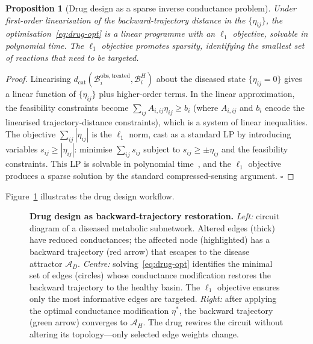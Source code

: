\documentclass[twocolumn,10pt,a4paper]{article}
\newcommand{\dcat}{d_{\mathrm{cat}}}
\newcommand{\Back}{\mathcal{B}}
\newtheorem{proposition}[theorem]{Proposition}
\begin{document}
\begin{proposition}[Drug design as a sparse inverse conductance problem]
\label{prop:drug-inverse}
Under first-order linearisation of the backward-trajectory distance in the
$\{\eta_{ij}\}$, the optimisation~\eqref{eq:drug-opt} is a linear programme
with an $\ell_1$ objective, solvable in polynomial time.  The $\ell_1$
objective promotes sparsity, identifying the smallest set of reactions that
need to be targeted.
\end{proposition}

\begin{proof}
Linearising $\dcat(\Back_i^{\mathrm{obs,treated}},\Back_i^H)$ about the
diseased state $\{\eta_{ij}=0\}$ gives a linear function of $\{\eta_{ij}\}$
plus higher-order terms.  In the linear approximation, the feasibility
constraints become $\sum_{ij}A_{i,ij}\eta_{ij}\geq b_i$ (where $A_{i,ij}$ and
$b_i$ encode the linearised trajectory-distance constraints), which is a
system of linear inequalities.  The objective $\sum_{ij}|\eta_{ij}|$ is the
$\ell_1$ norm, cast as a standard LP by introducing variables $s_{ij}\geq
|\eta_{ij}|$: minimise $\sum_{ij}s_{ij}$ subject to
$s_{ij}\geq\pm\eta_{ij}$ and the feasibility constraints.
This LP is solvable in polynomial time~\cite{Pearl1988}, and the $\ell_1$
objective produces a sparse solution by the standard compressed-sensing
argument.  $\square$
\end{proof}

Figure~\ref{fig:drug-design} illustrates the drug design workflow.

\begin{figure}[t]
\centering
\fbox{\rule{0pt}{4cm}\rule{15cm}{0pt}}
\caption{\textbf{Drug design as backward-trajectory restoration.}
\emph{Left:} circuit diagram of a diseased metabolic subnetwork.  Altered edges
(thick) have reduced conductances; the affected node (highlighted) has a
backward trajectory (red arrow) that escapes to the disease attractor
$\mathcal{A}_D$.  \emph{Centre:} solving~\eqref{eq:drug-opt} identifies the
minimal set of edges (circles) whose conductance modification restores the
backward trajectory to the healthy basin.  The $\ell_1$ objective ensures
only the most informative edges are targeted.  \emph{Right:} after applying
the optimal conductance modification $\eta^*$, the backward trajectory (green
arrow) converges to $\mathcal{A}_H$.  The drug rewires the circuit without
altering its topology---only selected edge weights change.}
\label{fig:drug-design}
\end{figure}
\end{document}

